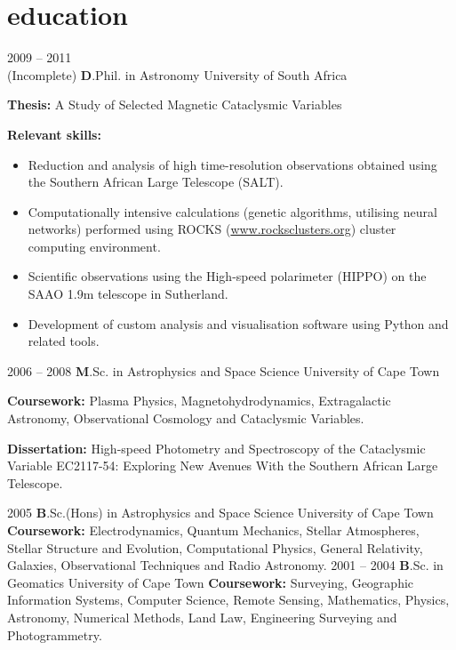 \documentclass[]{friggeri-cv} %
\begin{document}
\section{education}
\begin{entrylist}
\entry
{2009 -- 2011 \\(Incomplete)}
{\textbf D.Phil. in Astronomy}
{University of South Africa}
{{\textbf{Thesis:} A Study of Selected Magnetic Cataclysmic Variables}

{\textbf{Relevant skills:}
    \begin{itemize}
        \item Reduction and analysis of high time-resolution observations obtained using the Southern African Large Telescope (SALT).
        \item Computationally intensive calculations (genetic algorithms, utilising neural networks) performed
        using ROCKS (\url{www.rocksclusters.org}) cluster computing environment.
        \item Scientific observations using the High-speed polarimeter (HIPPO) on the SAAO 1.9m telescope in
        Sutherland.
        \item Development of custom analysis and visualisation software using Python and related tools.
\end{itemize}}
}
\end{entrylist}
\begin{entrylist}
\entry
{2006 -- 2008}
{\textbf M.Sc. in Astrophysics and Space Science}
{University of Cape Town}
{{\textbf{Coursework:} Plasma Physics, Magnetohydrodynamics, Extragalactic Astronomy, Observational
Cosmology and Cataclysmic Variables.}

{\textbf{Dissertation:} High-speed Photometry and Spectroscopy of the Cataclysmic Variable EC2117-54: Exploring New Avenues With the Southern African Large Telescope.}}
\end{entrylist}
\begin{entrylist}
\entry
{2005}
{\textbf B.Sc.(Hons) in Astrophysics and Space Science}
{University of Cape Town}
{{\textbf{Coursework:} Electrodynamics, Quantum Mechanics, Stellar Atmospheres, Stellar Structure and Evolution, Computational Physics, General Relativity, Galaxies, Observational Techniques and Radio Astronomy.}}
\entry
{2001 -- 2004}
{\textbf B.Sc. in Geomatics}
{University of Cape Town}
{{\textbf{Coursework:} Surveying, Geographic Information Systems, Computer Science, Remote Sensing,
Mathematics, Physics, Astronomy, Numerical Methods, Land Law, Engineering Surveying and Photogrammetry.}}
\end{entrylist}
\end{document}
